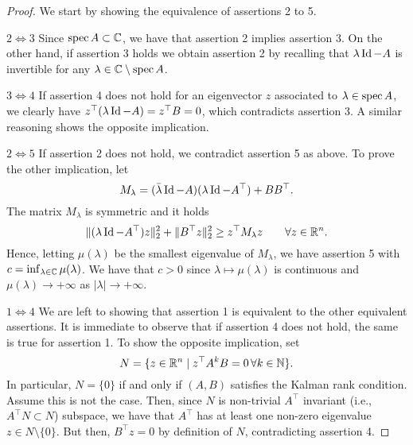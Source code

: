 \begin{proof}
    We start by showing the equivalence of assertions 2 to 5.

    \emph{$2\iff 3$} Since $\operatorname{spec} A \subset \mathbb{C}$, we have that assertion 2 implies assertion 3.
    On the other hand, if assertion 3 holds we obtain assertion 2 by recalling that $\lambda\operatorname{Id} - A$ is invertible for any $\lambda \in \mathbb{C}\setminus \operatorname{spec} A$.


    \emph{$3\iff 4$}
    If assertion 4 does not hold for an eigenvector $z$ associated to $\lambda\in \operatorname{spec} A$, we clearly have $z^\top (\lambda\operatorname{Id} - A)  =z^\top B=0$, which contradicts assertion 3. A similar reasoning shows the opposite implication.

    \emph{$2\iff 5$} If assertion 2 does not hold, we contradict assertion 5 as above. To prove the other implication, let
    \begin{equation}
        M_\lambda = (\bar \lambda\operatorname{Id} - A)(\lambda \operatorname{Id} - A^\top ) + BB^\top.
    \end{equation}
    The matrix $M_\lambda$ is symmetric and it holds
    \begin{equation}
        \label{eq:lambda-c}
        \|(\lambda\operatorname{Id} - A^\top) z \|_2^2 + \|B^\top z\|_2^2 \ge z^\top M_\lambda z
        \qquad
        \forall z\in \mathbb{R}^n.
    \end{equation}
    Hence, letting $\mu(\lambda)$ be the smallest eigenvalue of $M_\lambda$, we have assertion 5 with $c = \inf_{\lambda \in \mathbb{C}} \mu(\lambda)$. We have that $c>0$ since $\lambda\mapsto \mu(\lambda)$ is continuous and $\mu(\lambda) \rightarrow + \infty$ as $|\lambda|\to +\infty$.

    \emph{$1\iff 4$}
    We are left to showing that assertion 1 is equivalent to the other equivalent assertions. 
    It is immediate to observe that if assertion 4 does not hold, the same is true for assertion 1. 
    To show the opposite implication,  set
    \begin{equation}
        N = \{ z\in\mathbb{R}^n\mid z^\top A^k B = 0\, \forall k\in \mathbb{N}\}.
    \end{equation}
    In particular, $N = \{0\}$ if and only if $(A,B)$ satisfies the Kalman rank condition. Assume this is not the case. Then, since $N$ is non-trivial $A^\top$ invariant (i.e., $A^\top N \subset N$) subspace, we have that $A^\top$ has at least one non-zero eigenvalue $z\in N\setminus\{0\}$. But then, $B^\top z=0$ by definition of $N$, contradicting assertion 4.
\end{proof}

